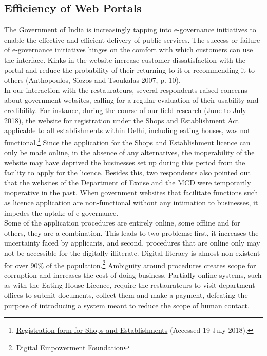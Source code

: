 \documentclass[a4paper, 12pt]{article}
\begin{document}
		\subsection{Efficiency of Web Portals}
		The Government of India is increasingly tapping into e-governance initiatives to enable the effective and efficient delivery of public services. The success or failure of e-governance initiatives hinges on the comfort with which customers can use the interface. Kinks in the website increase customer dissatisfaction with the portal and reduce the probability of their returning to it or recommending it to others (Anthopoulos, Siozos and Tsoukalas 2007, p. 10). \\
		In our interaction with the restaurateurs, several respondents raised concerns about government websites, calling for a regular evaluation of their usability and credibility. For instance, during the course of our field research (June to July 2018), the website for registration under the Shops and Establishment Act applicable to all establishments within Delhi, including eating houses, was not functional.\footnote{\href{https://bit.ly/2xfB6UJ}{Registration form for Shops and Establishments} (Accessed 19 July 2018).} Since the application for the Shops and Establishment licence can only be made online, in the absence of any alternatives, the inoperability of the website may have deprived the businesses set up during this period from the facility to apply for the licence. Besides this, two respondents also pointed out that the websites of the Department of Excise and the MCD were temporarily inoperative in the past. When government websites that facilitate functions such as licence application are non-functional without any intimation to businesses, it impedes the uptake of e-governance.\\
		Some of the application procedures are entirely online, some offline and for others, they are a combination. This leads to two problems: first, it increases the uncertainty faced by applicants, and second, procedures that are online only may not be accessible for the digitally illiterate. Digital literacy is almost non-existent for over 90\% of the population.\footnote{\href{https://bit.ly/2NMWdaj}{Digital Empowerment Foundation}}  Ambiguity around procedures creates scope for corruption and increases the cost of doing business. Partially online systems, such as with the Eating House Licence, require the restaurateurs to visit department offices to submit documents, collect them and make a payment, defeating the purpose of introducing a system meant to reduce the scope of human contact.
		
\end{document}
